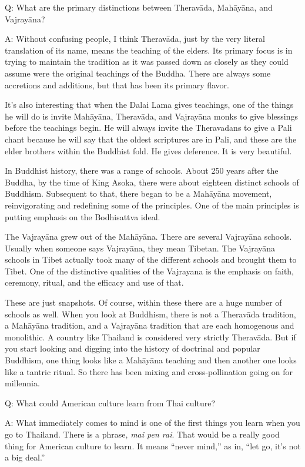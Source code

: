 \qaspace
Q: What are the primary distinctions between Theravāda, Mahāyāna, and
Vajrayāna?

\qaspace
A: Without confusing people, I think Theravāda, just by the very literal
translation of its name, means the teaching of the elders. Its primary
focus is in trying to maintain the tradition as it was passed down as
closely as they could assume were the original teachings of the Buddha.
There are always some accretions and additions, but that has been its
primary flavor.

It’s also interesting that when the Dalai Lama gives teachings, one of
the things he will do is invite Mahāyāna, Theravāda, and Vajrayāna monks
to give blessings before the teachings begin. He will always invite the
Theravadans to give a Pali chant because he will say that the oldest
scriptures are in Pali, and these are the elder brothers within the
Buddhist fold. He gives deference. It is very beautiful.

In Buddhist history, there was a range of schools. About 250 years after
the Buddha, by the time of King Asoka, there were about eighteen
distinct schools of Buddhism. Subsequent to that, there began to be a
Mahāyāna movement, reinvigorating and redefining some of the principles.
One of the main principles is putting emphasis on the Bodhisattva ideal.

The Vajrayāna grew out of the Mahāyāna. There are several Vajrayāna
schools. Usually when someone says Vajrayāna, they mean Tibetan. The
Vajrayāna schools in Tibet actually took many of the different schools
and brought them to Tibet. One of the distinctive qualities of the
Vajrayana is the emphasis on faith, ceremony, ritual, and the efficacy
and use of that.

These are just snapshots. Of course, within these there are a huge
number of schools as well. When you look at Buddhism, there is not a
Theravāda tradition, a Mahāyāna tradition, and a Vajrayāna tradition
that are each homogenous and monolithic. A country like Thailand is
considered very strictly Theravāda. But if you start looking and digging
into the history of doctrinal and popular Buddhism, one thing looks like
a Mahāyāna teaching and then another one looks like a tantric ritual. So
there has been mixing and cross-pollination going on for millennia.

\qaspace
Q: What could American culture learn from Thai culture?

\qaspace
A: What immediately comes to mind is one of the first things you learn
when you go to Thailand. There is a phrase, \emph{mai pen rai}. That
would be a really good thing for American culture to learn. It means
“never mind,” as in, “let go, it’s not a big deal.”


